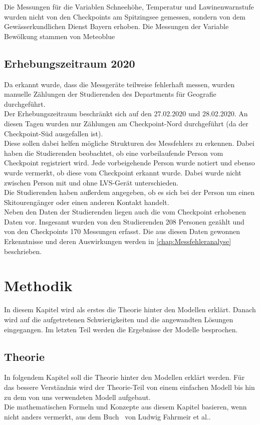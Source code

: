 \documentclass[12pt]{scrreprt}
\begin{document}
\noindent Die Messungen für die Variablen Schneehöhe, Temperatur und Lawinenwarnstufe wurden nicht von den Checkpoints am Spitzingsee gemessen, sondern von dem Gewässerkundlichen Dienst Bayern erhoben. Die Messungen der Variable Bewölkung stammen von Meteoblue %

\section{Erhebungszeitraum 2020}
Da erkannt wurde, dass die Messgeräte teilweise fehlerhaft messen, wurden manuelle Zählungen der Studierenden des Departments für Geografie durchgeführt. \\
Der Erhebungszeitraum beschränkt sich auf den 27.02.2020 und 28.02.2020. An diesen Tagen wurden nur Zählungen am Checkpoint-Nord durchgeführt (da der Checkpoint-Süd ausgefallen ist). \\
Diese sollen dabei helfen mögliche Strukturen des Messfehlers zu erkennen. Dabei haben die Studierenden beobachtet, ob eine vorbeilaufende Person vom Checkpoint registriert wird. Jede vorbeigehende Person wurde notiert und ebenso wurde vermerkt, ob diese vom Checkpoint erkannt wurde. Dabei wurde nicht zwischen Person mit und ohne LVS-Gerät unterschieden.\\ Die Studierenden haben außerdem angegeben, ob es sich bei der Person um einen Skitourengänger oder einen anderen Kontakt handelt. \\
Neben den Daten der Studierenden liegen auch die vom Checkpoint erhobenen Daten vor. Insgesamt wurden von den Studierenden 208 Personen gezählt und von den Checkpoints 170 Messungen erfasst. Die aus diesen Daten gewonnen Erkenntnisse und deren Auswirkungen werden in \autoref{chap:Messfehleranalyse} beschrieben. 

\chapter{Methodik}
In diesem Kapitel wird als erstes die Theorie hinter den Modellen erklärt. Danach wird auf die aufgetretenen Schwierigkeiten und die angewandten Lösungen eingegangen. Im letzten Teil werden die Ergebnisse der Modelle besprochen.

\section{Theorie}
In folgendem Kapitel soll die Theorie hinter den Modellen erklärt werden. Für das bessere Verständnis wird der Theorie-Teil von einem einfachen Modell bis hin zu dem von uns verwendeten Modell aufgebaut. \\
Die mathematischen Formeln und Konzepte aus diesem Kapitel basieren, wenn nicht anders vermerkt, aus dem Buch \grqq ~von Ludwig Fahrmeir et al..
\end{document}

